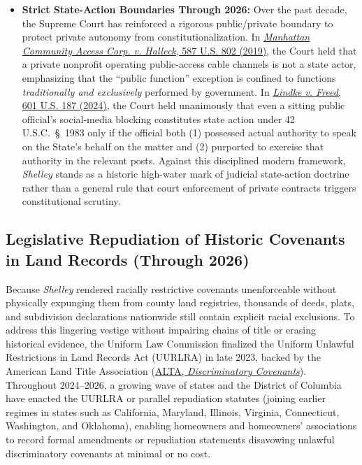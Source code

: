 \documentclass[12pt]{article}
\begin{document}
\begin{itemize}
    \item \textbf{Strict State-Action Boundaries Through 2026:} Over the past decade, the Supreme Court has reinforced a rigorous public/private boundary to protect private autonomy from constitutionalization. In \href{https://supreme.justia.com/cases/federal/us/587/17-1702/}{\textit{Manhattan Community Access Corp. v. Halleck}, 587 U.S. 802 (2019)}, the Court held that a private nonprofit operating public-access cable channels is not a state actor, emphasizing that the ``public function'' exception is confined to functions \textit{traditionally and exclusively} performed by government. In \href{https://supreme.justia.com/cases/federal/us/601/22-611/}{\textit{Lindke v. Freed}, 601 U.S. 187 (2024)}, the Court held unanimously that even a sitting public official's social-media blocking constitutes state action under 42 U.S.C.~\S~1983 only if the official both (1) possessed actual authority to speak on the State's behalf on the matter and (2) purported to exercise that authority in the relevant posts. Against this disciplined modern framework, \textit{Shelley} stands as a historic high-water mark of judicial state-action doctrine rather than a general rule that court enforcement of private contracts triggers constitutional scrutiny.
\end{itemize}

\subsection{Legislative Repudiation of Historic Covenants in Land Records (Through 2026)}
Because \textit{Shelley} rendered racially restrictive covenants unenforceable without physically expunging them from county land registries, thousands of deeds, plats, and subdivision declarations nationwide still contain explicit racial exclusions. To address this lingering vestige without impairing chains of title or erasing historical evidence, the Uniform Law Commission finalized the Uniform Unlawful Restrictions in Land Records Act (UURLRA) in late 2023, backed by the American Land Title Association (\href{https://www.alta.org/advocacy/advocacy-issues/discriminatory-covenants}{ALTA, \textit{Discriminatory Covenants}}). Throughout 2024--2026, a growing wave of states and the District of Columbia have enacted the UURLRA or parallel repudiation statutes (joining earlier regimes in states such as California, Maryland, Illinois, Virginia, Connecticut, Washington, and Oklahoma), enabling homeowners and homeowners' associations to record formal amendments or repudiation statements disavowing unlawful discriminatory covenants at minimal or no cost.
\end{document}
